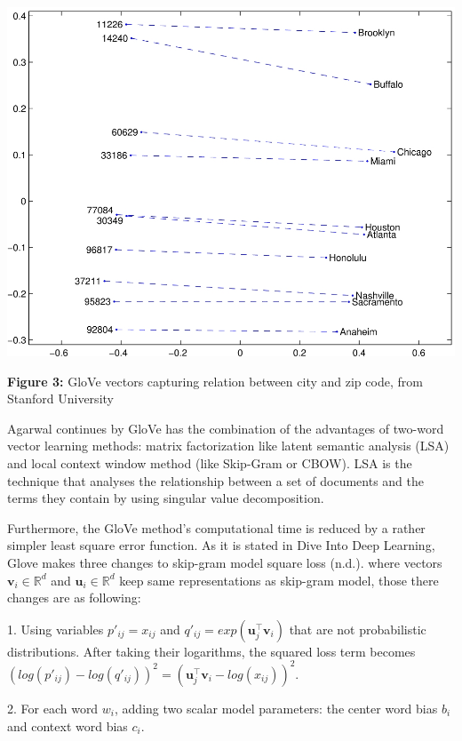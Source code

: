 \documentclass[man]{apa7}
\begin{document}
\begin{center}
\includegraphics[scale=3]{city_zip.jpg}

\textbf{Figure 3:} GloVe vectors capturing relation between city and zip code, from Stanford University\\[2\baselineskip]

\end{center}

Agarwal continues by GloVe has the combination of the advantages of two-word vector learning methods: matrix factorization like latent semantic analysis (LSA) and local context window method (like Skip-Gram or CBOW). LSA is the technique that analyses the relationship between a set of documents and the terms they contain by using singular value decomposition. 

Furthermore, the GloVe method's computational time is reduced by a rather simpler least square error function. As it is stated in Dive Into Deep Learning, Glove makes three changes to skip-gram model square loss (n.d.). where vectors $\mathbf{v_\mathit{i}} \in \mathbb{R}^d$ and $\mathbf{u_\mathit{i}} \in \mathbb{R}^d$ keep same representations as skip-gram model, those there changes are as following:

1. Using variables $p'_{ij} = x_{ij}$ and $q'_{ij} = exp(\mathbf{u}_j^\top \mathbf{v}_i)$ that are not probabilistic distributions. After taking their logarithms, the squared loss term becomes $(log(p'_{ij})-log(q'_{ij}))^2 = (\mathbf{u}_j^\top \mathbf{v}_i - log (x_{ij}))^2$.

2. For each word $w_i$, adding two scalar model parameters: the center word bias $b_i$ and context word bias $c_i$.
\end{document}
